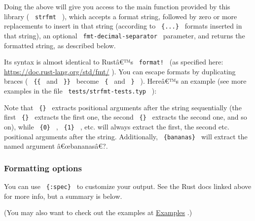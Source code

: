 Doing the above will give you access to the main function provided by
this library ( \texttt{\ strfmt\ } ), which accepts a format string,
followed by zero or more replacements to insert in that string
(according to \texttt{\ \{...\}\ } formats inserted in that string), an
optional \texttt{\ fmt-decimal-separator\ } parameter, and returns the
formatted string, as described below.

Its syntax is almost identical to Rustâ€™s \texttt{\ format!\ } (as
specified here: \url{https://doc.rust-lang.org/std/fmt/} ). You can
escape formats by duplicating braces ( \texttt{\ \{\{\ } and
\texttt{\ \}\}\ } become \texttt{\ \{\ } and \texttt{\ \}\ } ). Hereâ€™s
an example (see more examples in the file
\texttt{\ tests/strfmt-tests.typ\ } ):

\begin{Shaded}
\begin{Highlighting}[]

\end{Highlighting}
\end{Shaded}

Note that \texttt{\ \{\}\ } extracts positional arguments after the
string sequentially (the first \texttt{\ \{\}\ } extracts the first one,
the second \texttt{\ \{\}\ } extracts the second one, and so on), while
\texttt{\ \{0\}\ } , \texttt{\ \{1\}\ } , etc. will always extract the
first, the second etc. positional arguments after the string.
Additionally, \texttt{\ \{bananas\}\ } will extract the named argument
â€œbananasâ€?.

\subsubsection{Formatting options}\label{formatting-options}

You can use \texttt{\ \{:spec\}\ } to customize your output. See the
Rust docs linked above for more info, but a summary is below.

(You may also want to check out the examples at
\href{https://github.com/typst/packages/raw/main/packages/preview/oxifmt/0.2.1/\#examples}{Examples}
.)

